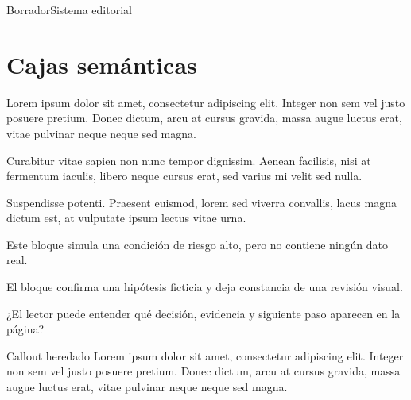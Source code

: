 \documentclass{claudeeditorial}
\newcommand{\LoremA}{Lorem ipsum dolor sit amet, consectetur adipiscing elit. Integer non sem vel justo posuere pretium. Donec dictum, arcu at cursus gravida, massa augue luctus erat, vitae pulvinar neque neque sed magna.}
\newcommand{\LoremB}{Curabitur vitae sapien non nunc tempor dignissim. Aenean facilisis, nisi at fermentum iaculis, libero neque cursus erat, sed varius mi velit sed nulla.}
\newcommand{\LoremC}{Suspendisse potenti. Praesent euismod, lorem sed viverra convallis, lacus magna dictum est, at vulputate ipsum lectus vitae urna.}
\begin{document}
\begin{Comparison}{Borrador}{Sistema editorial}
\end{Comparison}

\section{Cajas semánticas}

\begin{tcbraster}[raster columns=2,raster equal height=rows,raster column skip=10pt]
\begin{ClaudeInfo}[Contexto]
\LoremA
\end{ClaudeInfo}

\begin{ClaudeTip}[Consejo]
\LoremB
\end{ClaudeTip}

\begin{ClaudeWarning}[Atención]
\LoremC
\end{ClaudeWarning}

\begin{ClaudeCritical}[Crítico]
Este bloque simula una condición de riesgo alto, pero no contiene ningún dato real.
\end{ClaudeCritical}

\begin{ClaudeCheck}[Validación]
El bloque confirma una hipótesis ficticia y deja constancia de una revisión visual.
\end{ClaudeCheck}

\begin{ClaudeQuestion}[Pregunta]
¿El lector puede entender qué decisión, evidencia y siguiente paso aparecen en la página?
\end{ClaudeQuestion}
\end{tcbraster}

\begin{claudecallout}{Callout heredado}
\LoremA
\end{claudecallout}
\end{document}
